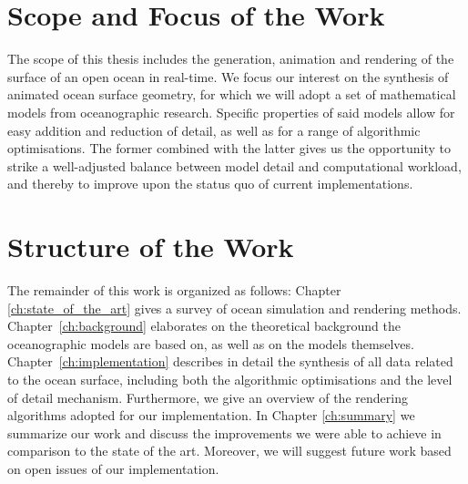 \section{Scope and Focus of the Work}
\label{sec:scope_and_focus}
The scope of this thesis includes the generation, animation and rendering of the
surface of an open ocean in real-time. We focus our interest on the synthesis of
animated ocean surface geometry, for which we will adopt a set of mathematical
models from oceanographic research. Specific properties of said models allow for
easy addition and reduction of detail, as well as for a range of algorithmic
optimisations. The former combined with the latter gives us the opportunity to
strike a well-adjusted balance between model detail and computational workload,
and thereby to improve upon the status quo of current implementations.
%
%
\section{Structure of the Work}
\label{sec:structure}
The remainder of this work is organized as follows: Chapter
\ref{ch:state_of_the_art} gives a survey of ocean simulation and rendering
methods. Chapter~\ref{ch:background} elaborates on the theoretical background
the oceanographic models are based on, as well as on the models themselves.
Chapter~\ref{ch:implementation} describes in detail the
synthesis of all data related to the ocean surface, including both the algorithmic
optimisations and the level of detail mechanism. Furthermore, we give an overview
of the rendering algorithms adopted for our implementation. In Chapter
\ref{ch:summary} we summarize our work and discuss the improvements we were able
to achieve in comparison to the state of the art. Moreover, we will suggest
future work based on open issues of our implementation.
